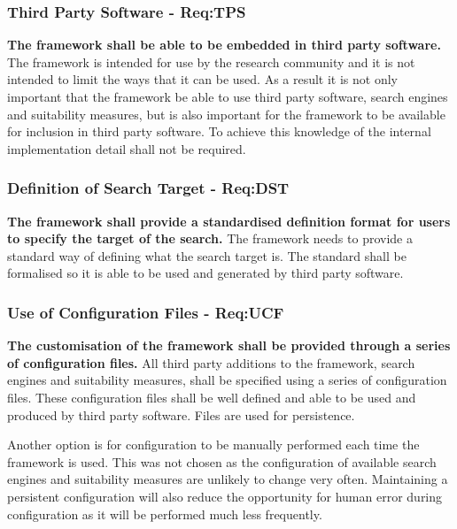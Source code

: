 \subsubsection{Third Party Software - Req:TPS}
\label{sec:reqtps}
\textbf{The framework shall be able to be embedded in third party software.}
The framework is intended for use by the research community and it is not intended to limit the ways that it can be used.
As a result it is not only important that the framework be able to use third party software, search engines and suitability measures, but is also important for the framework to be available for inclusion in third party software.
To achieve this knowledge of the internal implementation detail shall not be required.

\subsubsection{Definition of Search Target - Req:DST}
\label{sec:reqdst}
\textbf{The framework shall provide a standardised definition format for users to specify the target of the search.}
The framework needs to provide a standard way of defining what the search target is.
The standard shall be formalised so it is able to be used and generated by third party software.

\subsubsection{Use of Configuration Files - Req:UCF}
\label{sec:requcf}
\textbf{The customisation of the framework shall be provided through a series of configuration files.}
All third party additions to the framework, search engines and suitability measures, shall be specified using a series of configuration files.
These configuration files shall be well defined and able to be used and produced by third party software.
Files are used for persistence.

Another option is for configuration to be manually performed each time the framework is used.
This was not chosen as the configuration of available search engines and suitability measures are unlikely to change very often.
Maintaining a persistent configuration will also reduce the opportunity for human error during configuration as it will be performed much less frequently.

